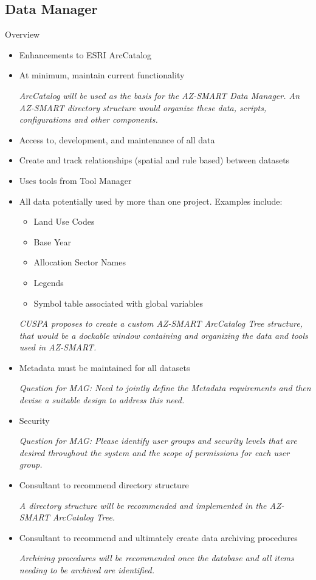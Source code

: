 \documentclass[titlepage]{article}
\begin{document}
\subsection{Data Manager}
Overview
\begin{itemize}
\item Enhancements to ESRI ArcCatalog
\item At minimum, maintain current functionality

\emph{ArcCatalog will be used as the basis for the AZ-SMART Data Manager.  An AZ-SMART directory structure would organize these data, scripts, configurations and other components.}

\item Access to, development, and maintenance of all data
\item Create and track relationships (spatial and rule based) between datasets
\item Uses tools from Tool Manager
\item All data potentially used by more than one project. Examples include:
\begin{itemize}
\item Land Use Codes
\item Base Year
\item Allocation Sector Names
\item Legends
\item Symbol table associated with global variables
\end{itemize}

\emph{CUSPA proposes to create a custom AZ-SMART ArcCatalog Tree structure, that would be a dockable window containing and organizing the data and tools used in AZ-SMART.}


\item Metadata must be maintained for all datasets

\emph{Question for MAG: Need to jointly define the Metadata requirements and then devise a suitable design to address this need.}

\item Security

\emph{Question for MAG: Please identify user groups and security levels that are desired throughout the system and the scope of permissions for each user group.}

\item Consultant to recommend directory structure

\emph{A directory structure will be recommended and implemented in the AZ-SMART ArcCatalog Tree.}

\item Consultant to recommend and ultimately create data archiving procedures

\emph{Archiving procedures will be recommended once the database and all items needing to be archived are identified.}

\end{itemize}
\end{document}
